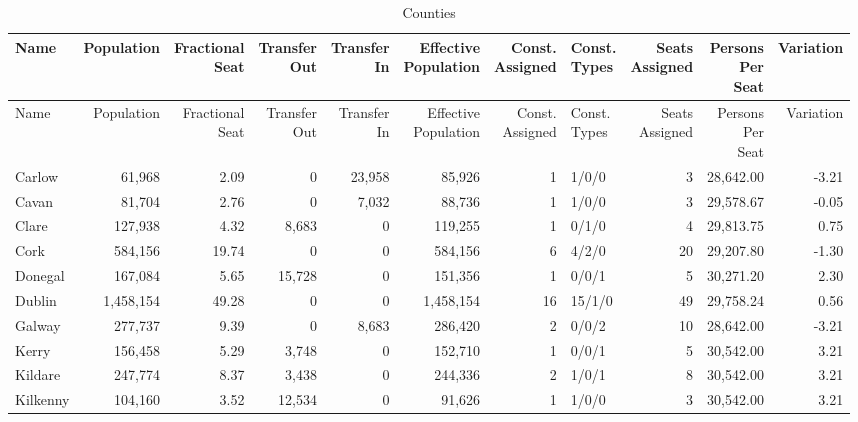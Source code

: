 \documentclass[a4paper]{article}
\begin{document}
\begin{longtable}{lrrrrrrlrrr}
\caption{Counties}
\\ \toprule
Name &Population &\shortstack{Fractional\\Seat} &\shortstack{Transfer\\Out} &\shortstack{Transfer\\In} &\shortstack{Effective\\Population} &\shortstack{Const.\\Assigned} &\shortstack{Const.\\Types} &\shortstack{Seats\\Assigned} &\shortstack{Persons\\Per\\Seat} &Variation \\ \midrule
\endfirsthead
\toprule
Name &Population &\shortstack{Fractional\\Seat} &\shortstack{Transfer\\Out} &\shortstack{Transfer\\In} &\shortstack{Effective\\Population} &\shortstack{Const.\\Assigned} &\shortstack{Const.\\Types} &\shortstack{Seats\\Assigned} &\shortstack{Persons\\Per\\Seat} &Variation \\ \midrule
\endhead
\bottomrule
\endfoot
Carlow&61,968& 2.09&0&23,958&85,926&1&1/0/0&3&28,642.00&-3.21\\ 
Cavan&81,704& 2.76&0&7,032&88,736&1&1/0/0&3&29,578.67&-0.05\\ 
Clare&127,938& 4.32&8,683&0&119,255&1&0/1/0&4&29,813.75& 0.75\\ 
Cork&584,156&19.74&0&0&584,156&6&4/2/0&20&29,207.80&-1.30\\ 
Donegal&167,084& 5.65&15,728&0&151,356&1&0/0/1&5&30,271.20& 2.30\\ 
Dublin&1,458,154&49.28&0&0&1,458,154&16&15/1/0&49&29,758.24& 0.56\\ 
Galway&277,737& 9.39&0&8,683&286,420&2&0/0/2&10&28,642.00&-3.21\\ 
Kerry&156,458& 5.29&3,748&0&152,710&1&0/0/1&5&30,542.00& 3.21\\ 
Kildare&247,774& 8.37&3,438&0&244,336&2&1/0/1&8&30,542.00& 3.21\\ 
Kilkenny&104,160& 3.52&12,534&0&91,626&1&1/0/0&3&30,542.00& 3.21\\ 

\end{longtable}
\end{document}

